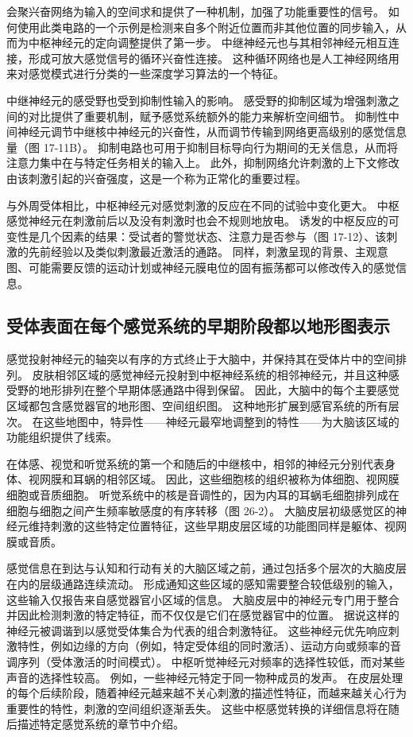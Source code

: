 会聚兴奋网络为输入的空间求和提供了一种机制，加强了功能重要性的信号。 如何使用此类电路的一个示例是检测来自多个附近位置而非其他位置的同步输入，从而为中枢神经元的定向调整提供了第一步。 中继神经元也与其相邻神经元相互连接，形成可放大感觉信号的循环兴奋性连接。 这种循环网络也是人工神经网络用来对感觉模式进行分类的一些深度学习算法的一个特征。

中继神经元的感受野也受到抑制性输入的影响。 感受野的抑制区域为增强刺激之间的对比提供了重要机制，赋予感觉系统额外的能力来解析空间细节。 抑制性中间神经元调节中继核中神经元的兴奋性，从而调节传输到网络更高级别的感觉信息量（图 17-11B）。 抑制电路也可用于抑制目标导向行为期间的无关信息，从而将注意力集中在与特定任务相关的输入上。 此外，抑制网络允许刺激的上下文修改由该刺激引起的兴奋强度，这是一个称为正常化的重要过程。

与外周受体相比，中枢神经元对感觉刺激的反应在不同的试验中变化更大。 中枢感觉神经元在刺激前后以及没有刺激时也会不规则地放电。 诱发的中枢反应的可变性是几个因素的结果：受试者的警觉状态、注意力是否参与（图 17-12）、该刺激的先前经验以及类似刺激最近激活的通路。 同样，刺激呈现的背景、主观意图、可能需要反馈的运动计划或神经元膜电位的固有振荡都可以修改传入的感觉信息。


\subsection{受体表面在每个感觉系统的早期阶段都以地形图表示}

感觉投射神经元的轴突以有序的方式终止于大脑中，并保持其在受体片中的空间排列。 皮肤相邻区域的感觉神经元投射到中枢神经系统的相邻神经元，并且这种感受野的地形排列在整个早期体感通路中得到保留。 因此，大脑中的每个主要感觉区域都包含感觉器官的地形图、空间组织图。 这种地形扩展到感官系统的所有层次。 在这些地图中，特异性——神经元最窄地调整到的特性——为大脑该区域的功能组织提供了线索。

在体感、视觉和听觉系统的第一个和随后的中继核中，相邻的神经元分别代表身体、视网膜和耳蜗的相邻区域。 因此，这些细胞核的组织被称为体细胞、视网膜细胞或音质细胞。 听觉系统中的核是音调性的，因为内耳的耳蜗毛细胞排列成在细胞与细胞之间产生频率敏感度的有序转移（图 26-2）。 大脑皮层初级感觉区的神经元维持刺激的这些特定位置特征，这些早期皮层区域的功能图同样是躯体、视网膜或音质。

感觉信息在到达与认知和行动有关的大脑区域之前，通过包括多个层次的大脑皮层在内的层级通路连续流动。 形成通知这些区域的感知需要整合较低级别的输入，这些输入仅报告来自感觉器官小区域的信息。 大脑皮层中的神经元专门用于整合并因此检测刺激的特定特征，而不仅仅是它们在感觉器官中的位置。 据说这样的神经元被调谐到以感觉受体集合为代表的组合刺激特征。 这些神经元优先响应刺激特性，例如边缘的方向（例如，特定受体组的同时激活）、运动方向或频率的音调序列（受体激活的时间模式）。 中枢听觉神经元对频率的选择性较低，而对某些声音的选择性较高。 例如，一些神经元特定于同一物种成员的发声。 在皮层处理的每个后续阶段，随着神经元越来越不关心刺激的描述性特征，而越来越关心行为重要性的特性，刺激的空间组织逐渐丢失。 这些中枢感觉转换的详细信息将在随后描述特定感觉系统的章节中介绍。


